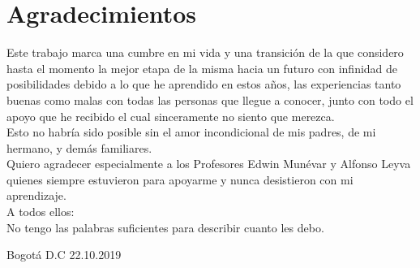 \clearpage
\thispagestyle{empty}
\section*{Agradecimientos}
\label{sec:SOOA}

\vspace{2.5cm}


Este trabajo marca una cumbre en mi vida y una transición de la que considero hasta el momento la mejor etapa de la misma hacia un futuro con infinidad de posibilidades debido a lo que he aprendido en estos años, las experiencias tanto buenas como malas con todas las personas que llegue a conocer, junto con todo el apoyo que he recibido el cual sinceramente no siento que merezca.\\

Esto no habría sido posible sin el amor incondicional de mis padres, de mi hermano, y demás familiares.\\

Quiero agradecer especialmente a los Profesores Edwin Munévar y Alfonso Leyva quienes siempre estuvieron para apoyarme y nunca desistieron con mi aprendizaje.\\


A todos ellos:\\
No tengo las palabras suficientes para describir cuanto les debo.

\vspace{1cm}



\vspace{3cm}
\noindent
\textbf{\thesisauthor{}}

\vspace{0.5cm}
\noindent
Bogotá D.C 22.10.2019
